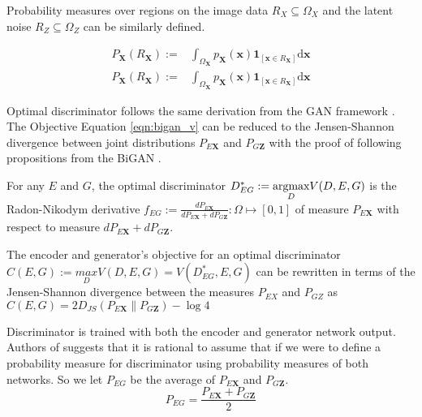{Probability measures over regions on the image data $R_X \subseteq \Omega_{X}$ and the latent noise
$R_Z \subseteq \Omega_{Z}$ can be similarly defined.

\begin{align}
    P_{\mathbf{X}}\left(R_{\mathbf{X}}\right) :=&\int_{\Omega_{\mathbf{X}}} p_{\mathbf{X}}(\mathbf{x}) \mathbf{1}_{\left[\mathbf{x} \in R_{\mathbf{X}}\right]} \mathrm{d} \mathbf{x} \\[5pt]
    P_{\mathbf{X}}\left(R_{\mathbf{X}}\right) :=&\int_{\Omega_{\mathbf{X}}} p_{\mathbf{X}}(\mathbf{x}) \mathbf{1}_{\left[\mathbf{x} \in R_{\mathbf{X}}\right]} \mathrm{d} \mathbf{x}
\end{align}

Optimal discriminator follows the same derivation from the GAN framework
\cite{Goodfellow:2014:GAN:2969033.2969125}. The Objective Equation \ref{eqn:bigan_v} can be reduced
to the Jensen-Shannon divergence between joint distributions $P_{E\mathbf{X}}$ and $P_{G\mathbf{Z}}$
with the proof of following propositions from the BiGAN \cite{Donahue2017AdversarialFL}.

\begin{prop}
    \label{prop:bigan_1}
    For any $E$ and $G$, the optimal discriminator $D^*_{EG} := \\ \underset{D}{\text{argmax}}  V(D, E,
    G)$ is the Radon-Nikodym derivative $f_{EG} := \frac{dP_{E\mathbf{X}}}{dP_{E\mathbf{X}} +
    dP_{G\mathbf{Z}}}  : \Omega  \mapsto [0, 1]$ of measure $P_{E\mathbf{X}}$ with respect to measure
    $ dP_{E\mathbf{X}} + dP_{G\mathbf{Z}}$.
\end{prop}

\begin{prop}
    \label{prop:bigan_2}
  The encoder and generator's objective for an optimal discriminator $C(E, G):= \underset{D}{max}
  V(D, E, G) = V(D^*_{EG}, E, G)$ can be rewritten in terms of the Jensen-Shannon divergence between
  the measures $P_{EX}$ and $P_{GZ}$ as $C(E, G) = 2 D_{JS} (P_{E\mathbf{X}} \parallel P_{G\mathbf{Z}}) -
  \log 4$    
\end{prop}

Discriminator is trained with both the encoder and generator network output. Authors of \cite{Donahue2017AdversarialFL}
suggests that it is rational to assume that if we were to define a probability measure for discriminator using 
probability measures of both networks. So we let $P_{EG}$
be the average of $P_{E\mathbf{X}}$ and $P_{G\mathbf{Z}}$. 
\begin{equation}
  P_{EG} = \frac{P_{E\mathbf{X}} + P_{G\mathbf{Z}}}{2}  
\end{equation}

}
